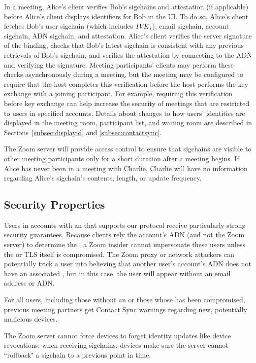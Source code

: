 In a meeting, Alice's client verifies Bob's sigchains and \idp attestation (if applicable) before
Alice's client displays identifiers for Bob in the UI. To do so, Alice's client fetches Bob's user
sigchain (which includes $\mathit{IVK}_i$), email sigchain, account sigchain, ADN sigchain, and \idp
attestation. Alice's client verifies the server signature of the binding, checks that Bob's latest
sigchain is consistent with any previous retrievals of Bob's sigchain, and verifies the \idp
attestation by connecting to the ADN and verifying the \idp signature. Meeting participants'
clients may perform these checks asynchronously during a meeting, but the meeting may be configured
to require that the host completes this verification before the host performs the key exchange with a
joining participant. For example, requiring this verification before key exchange can help increase
the security of meetings that are restricted to users in specified accounts. Details about changes
to how users' identities are displayed in the meeting room, participant list, and waiting room are
described in Sections~\ref{subsec:displayid} and \ref{subsec:contactsync}.

The Zoom server will provide access control to ensure that sigchains are visible to other meeting
participants only for a short duration after a meeting begins. If Alice has never been
in a meeting with Charlie, Charlie will have no information regarding Alice's sigchain's contents,
length, or update frequency.

\subsection{Security Properties}

Users in accounts with an \idp that supports our protocol receive particularly strong security
guarantees. Because clients rely the account's ADN (and not the Zoom server) to determine the \idp,
a Zoom insider cannot impersonate these users unless the \idp or TLS itself is compromised. The Zoom
proxy or network attackers can potentially trick a user into believing that another user's account's
ADN does not have an associated \idp, but in this case, the user will appear without an email
address or ADN.

For all users, including those without an \idp or those whose \idp has been compromised, previous
meeting partners get Contact Sync warnings regarding new, potentially malicious devices.

The Zoom server cannot force devices to forget identity updates like device revocations: when
receiving sigchains, devices make sure the server cannot ``rollback" a sigchain to a previous point
in time.

